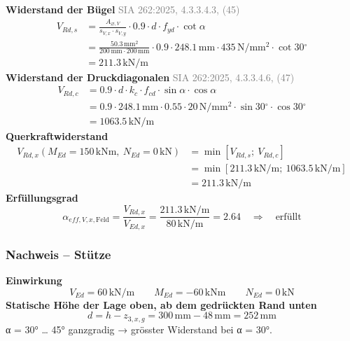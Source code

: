 \documentclass[11pt,a4paper]{article}
\newcommand{\normref}[1]{{\small\textcolor{gray}{#1}}}
\begin{document}
\noindent\textbf{Widerstand der Bügel} \hfill \normref{SIA 262:2025, 4.3.3.4.3, (45)}
\begin{equation*}
\begin{aligned}
  V_{Rd,s} &= \frac{A_{\varnothing,V}}{s_{V,x} \cdot s_{V,y}} \cdot 0.9 \cdot d \cdot f_{yd} \cdot \cot \alpha \\
  &= \frac{50.3\,\mathrm{mm}^{2}}{200\,\mathrm{mm} \cdot 200\,\mathrm{mm}} \cdot 0.9 \cdot 248.1\,\mathrm{mm} \cdot 435\,\mathrm{N}/\mathrm{mm}^{2} \cdot \cot 30{}^{\circ} \\
  &= 211.3\,\mathrm{kN}/\mathrm{m}
\end{aligned}
\end{equation*}
\noindent\textbf{Widerstand der Druckdiagonalen} \hfill \normref{SIA 262:2025, 4.3.3.4.6, (47)}
\begin{equation*}
\begin{aligned}
  V_{Rd,c} &= 0.9 \cdot d \cdot k_c \cdot f_{cd} \cdot \sin \alpha \cdot \cos \alpha \\
  &= 0.9 \cdot 248.1\,\mathrm{mm} \cdot 0.55 \cdot 20\,\mathrm{N}/\mathrm{mm}^{2} \cdot \sin 30{}^{\circ} \cdot \cos 30{}^{\circ} \\
  &= 1063.5\,\mathrm{kN}/\mathrm{m}
\end{aligned}
\end{equation*}
\noindent\textbf{Querkraftwiderstand}
\begin{equation*}
\begin{aligned}
  V_{Rd,x}(M_{Ed} = 150\,\mathrm{kNm},\ N_{Ed} = 0\,\mathrm{kN}) &= \min\left[V_{Rd,s};\ V_{Rd,c}\right] \\
  &= \min\left[211.3\,\mathrm{kN}/\mathrm{m};\ 1063.5\,\mathrm{kN}/\mathrm{m}\right] \\
  &= 211.3\,\mathrm{kN}/\mathrm{m}
\end{aligned}
\end{equation*}
\noindent\textbf{Erfüllungsgrad}
\begin{equation*}
\alpha_{eff,V,x,\text{Feld}} = \frac{V_{Rd,x}}{V_{Ed,x}} = \frac{211.3\,\mathrm{kN}/\mathrm{m}}{80\,\mathrm{kN}/\mathrm{m}} = 2.64 \quad \Rightarrow \quad \text{erfüllt}
\end{equation*}
\subsubsection{Nachweis – Stütze}
\noindent\textbf{Einwirkung}
\begin{equation*}
V_{Ed} = 60\,\mathrm{kN}/\mathrm{m} \qquad M_{Ed} = -60\,\mathrm{kNm} \qquad N_{Ed} = 0\,\mathrm{kN}
\end{equation*}
\noindent\textbf{Statische Höhe der Lage oben, ab dem gedrückten Rand unten}
\begin{equation*}
d = h - z_{3,x,g} = 300\,\mathrm{mm} - 48\,\mathrm{mm} = 252\,\mathrm{mm}
\end{equation*}
α = 30° … 45° ganzgradig → grösster Widerstand bei α = 30°.
\end{document}
